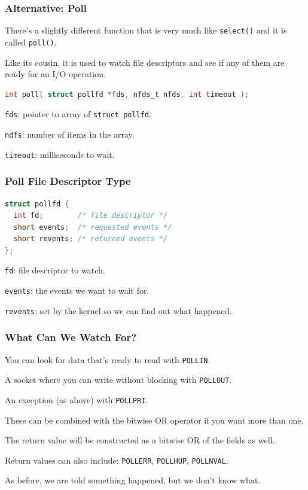 \begin{frame}[fragile]
\frametitle{Alternative: Poll}

There's a slightly different function that is very much like \texttt{select()} and it is called \texttt{poll()}. 

Like its cousin, it is used to watch file descriptors and see if any of them are ready for an I/O operation. 

\begin{lstlisting}[language=C]
int poll( struct pollfd *fds, nfds_t nfds, int timeout );
\end{lstlisting}

\texttt{fds}: pointer to array of  \texttt{struct pollfd}.

\texttt{ndfs}: number of items in the array.

\texttt{timeout}: milliseconds to wait.

\end{frame}

\begin{frame}[fragile]
\frametitle{Poll File Descriptor Type}

\begin{lstlisting}[language=C]
struct pollfd {
  int fd;        /* file descriptor */
  short events;  /* requested events */
  short revents; /* returned events */
};
\end{lstlisting}

\texttt{fd}: file descriptor to watch.

\texttt{events}: the events we want to wait for.

\texttt{revents}: set by the kernel so we can find out what happened.

\end{frame}

\begin{frame}
\frametitle{What Can We Watch For?}

You can look for data that's ready to read with \texttt{POLLIN}.

A socket where you can write without blocking with \texttt{POLLOUT}. 

An exception (as above) with \texttt{POLLPRI}. 

These can be combined with the bitwise OR operator if you want more than one. 

The return value will be constructed as a bitwise OR of the fields as well.

Return values can also include: \texttt{POLLERR}, \texttt{POLLHUP}, \texttt{POLLNVAL}.

As before, we are told something happened, but we don't know what.

\end{frame}


